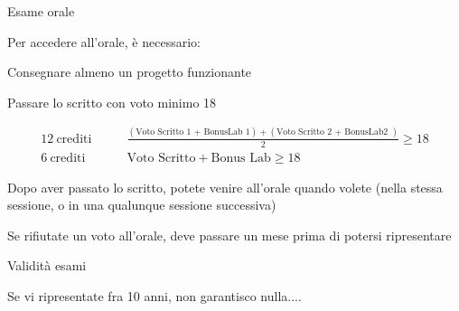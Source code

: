 \begin{frame}{Esame orale}

Per accedere all'orale, è necessario:
\BI
\item Consegnare almeno un progetto funzionante 
\item Passare lo scritto con voto minimo 18

\begingroup
\tiny
\begin{align*}
  \mathrm{12\ crediti} & \qquad \frac{(\textrm{Voto Scritto 1 + BonusLab 1}) + (\textrm{Voto Scritto 2 + BonusLab2 })}{2} \geq 18 \\
  \mathrm{6\ crediti} & \qquad \textrm{Voto Scritto} + \textrm{Bonus Lab} \geq 18 
\end{align*}
\endgroup

\item Dopo aver passato lo scritto, potete venire all'orale quando volete
(nella stessa sessione, o in una qualunque sessione successiva)
\item Se rifiutate un voto all’orale, deve passare un mese prima di potersi ripresentare
\EI
\end{frame}

\begin{frame}{Validità esami}

\vspace{-9pt}

\medskip
{}

\medskip
{}
\BI
\item Se vi ripresentate fra 10 anni, non garantisco nulla....
\EI

\end{frame}

